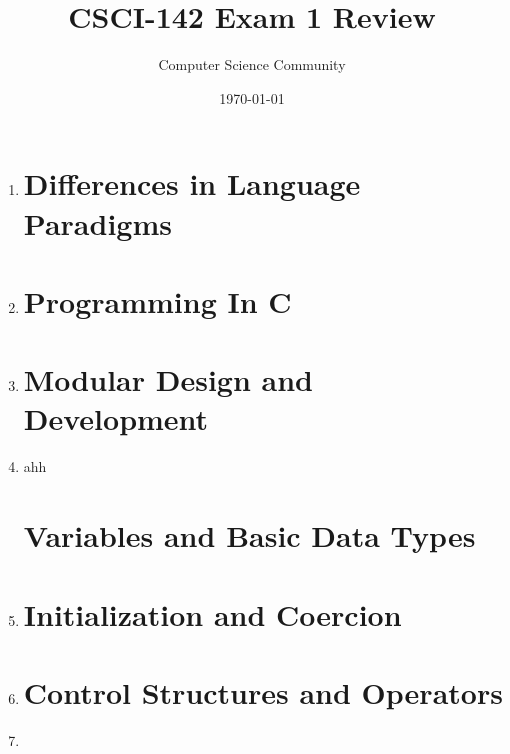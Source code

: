 \documentclass[11pt]{article}
\title{CSCI-142 Exam 1 Review}
\author{Computer Science Community}
\date{\today}
\begin{document}
\header

\begin{enumerate}

\section*{History and Evolution of Programming Languages}

	\item 

\section*{Differences in Language Paradigms}

	\item 

\section*{Programming In C}

	\item 

\section*{Modular Design and Development}

	\item ahh

\section*{Variables and Basic Data Types}

	\item 

\section*{Initialization and Coercion}

	\item 

\pagebreak
\section*{Control Structures and Operators}

	\item 


\end{enumerate}
\end{document}
